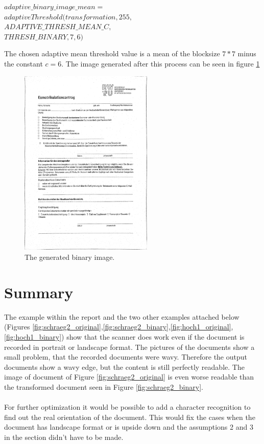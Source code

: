 \documentclass[twocolumn,10pt]{asme2ej}
\begin{document}
\begin{center}
    \noindent
    $adaptive\_binary\_image\_mean = $\\
    $adaptiveThreshold(transformation,255,$\\
    $ADAPTIVE\_THRESH\_MEAN\_C, $\\
    $THRESH\_BINARY,7,6)$
\end{center}
\noindent
 \noindent
The chosen adaptive mean threshold value is a mean of the blocksize $7*7$ minus the constant $c=6$.
The image generated after this process can be seen in figure \ref{fig:binary}

\begin{figure}[H]
    \centerline{\includegraphics[width=2.5in]{output/hoch_3_8_adaptive_binary_image_mean.jpg}}
    \caption{The generated binary image.}
    \label{fig:binary}
\end{figure}

\section{Summary}
\noindent
The example within the report and the two other examples attached below (Figures \ref{fig:schraeg2_original},\ref{fig:schraeg2_binary},\ref{fig:hoch1_original},\ref{fig:hoch1_binary}) show that the scanner does work even if the document is recorded in portrait or landscape format. The pictures of the documents show a small problem, that the recorded documents were wavy. Therefore the output documents show a wavy edge, but the content is still perfectly readable. The image of document of Figure \ref{fig:schraeg2_original} is even worse readable than the transformed document seen in Figure \ref{fig:schraeg2_binary}.\\\\
For further optimization it would be possible to add a character recognition to find out the real orientation of the document. This would fix the cases when the document has landscape format or is upside down and the assumptions 2 and 3 in the section  didn't have to be made.
\end{document}

